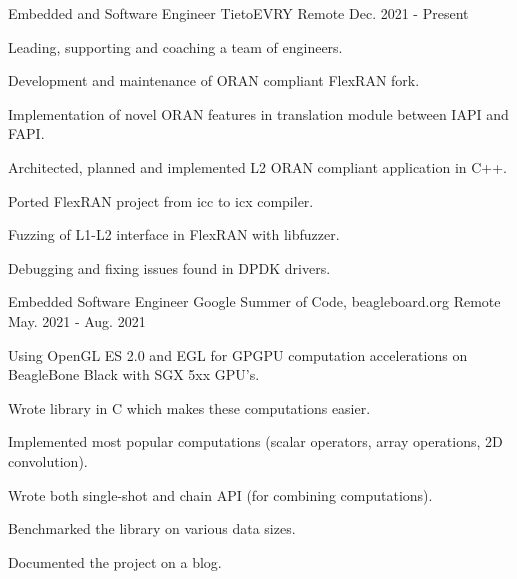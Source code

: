 

\begin{cventries}

  \cventry
    {Embedded and Software Engineer} %
    {TietoEVRY} %
    {Remote} %
    {Dec. 2021 - Present} %
    {
      \begin{cvitems} %
          \item { Leading, supporting and coaching a team of engineers. }
          \item { Development and maintenance of ORAN compliant FlexRAN fork. }
          \item { Implementation of novel ORAN features in translation module between IAPI and FAPI. }
          \item { Architected, planned and implemented L2 ORAN compliant application in C++. }
          \item { Ported FlexRAN project from icc to icx compiler. }
          \item { Fuzzing of L1-L2 interface in FlexRAN with libfuzzer. }
          \item { Debugging and fixing issues found in DPDK drivers. }
      \end{cvitems}
    }

  \cventry
    {Embedded Software Engineer} %
    {Google Summer of Code, beagleboard.org} %
    {Remote} %
    {May. 2021 - Aug. 2021} %
    {
      \begin{cvitems} %
          \item { Using OpenGL ES 2.0 and EGL for GPGPU computation accelerations on BeagleBone Black with SGX 5xx GPU's.}
          \item { Wrote library in C which makes these computations easier. }
          \item { Implemented most popular computations (scalar operators, array operations, 2D convolution). }
          \item { Wrote both single-shot and chain API (for combining computations). }
          \item { Benchmarked the library on various data sizes. }
          \item { Documented the project on a blog.}
      \end{cvitems}
    }


\end{cventries}
